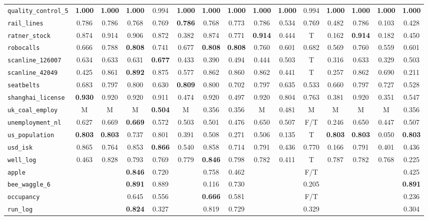 \begin{tabular}{lcccccccccccccc}
\verb+quality_control_5+ & \textbf{1.000} & \textbf{1.000} & \textbf{1.000} & 0.994 & \textbf{1.000} & \textbf{1.000} & \textbf{1.000} & \textbf{1.000} & \textbf{1.000} & 0.994 & \textbf{1.000} & \textbf{1.000} & \textbf{1.000} & \textbf{1.000}\\
\verb+rail_lines+ & 0.786 & 0.786 & 0.768 & 0.769 & \textbf{0.786} & 0.768 & 0.773 & 0.786 & 0.534 & 0.769 & 0.482 & 0.786 & 0.103 & 0.428\\
\verb+ratner_stock+ & 0.874 & 0.914 & 0.906 & 0.872 & 0.382 & 0.874 & 0.771 & \textbf{0.914} & 0.444 & T & 0.162 & \textbf{0.914} & 0.182 & 0.450\\
\verb+robocalls+ & 0.666 & 0.788 & \textbf{0.808} & 0.741 & 0.677 & \textbf{0.808} & \textbf{0.808} & 0.760 & 0.601 & 0.682 & 0.569 & 0.760 & 0.559 & 0.601\\
\verb+scanline_126007+ & 0.634 & 0.633 & 0.631 & \textbf{0.677} & 0.433 & 0.390 & 0.494 & 0.444 & 0.503 & T & 0.316 & 0.633 & 0.329 & 0.503\\
\verb+scanline_42049+ & 0.425 & 0.861 & \textbf{0.892} & 0.875 & 0.577 & 0.862 & 0.860 & 0.862 & 0.441 & T & 0.257 & 0.862 & 0.690 & 0.211\\
\verb+seatbelts+ & 0.683 & 0.797 & 0.800 & 0.630 & \textbf{0.809} & 0.800 & 0.702 & 0.797 & 0.635 & 0.533 & 0.660 & 0.797 & 0.727 & 0.528\\
\verb+shanghai_license+ & \textbf{0.930} & 0.920 & 0.920 & 0.911 & 0.474 & 0.920 & 0.497 & 0.920 & 0.804 & 0.763 & 0.381 & 0.920 & 0.351 & 0.547\\
\verb+uk_coal_employ+ & M & M & M & \textbf{0.504} & M & 0.356 & 0.356 & M & 0.481 & M & M & M & M & 0.356\\
\verb+unemployment_nl+ & 0.627 & 0.669 & \textbf{0.669} & 0.572 & 0.503 & 0.501 & 0.476 & 0.650 & 0.507 & F/T & 0.246 & 0.650 & 0.447 & 0.507\\
\verb+us_population+ & \textbf{0.803} & \textbf{0.803} & 0.737 & 0.801 & 0.391 & 0.508 & 0.271 & 0.506 & 0.135 & T & \textbf{0.803} & \textbf{0.803} & 0.050 & \textbf{0.803}\\
\verb+usd_isk+ & 0.865 & 0.764 & 0.853 & \textbf{0.866} & 0.540 & 0.858 & 0.714 & 0.791 & 0.436 & 0.770 & 0.166 & 0.791 & 0.401 & 0.436\\
\verb+well_log+ & 0.463 & 0.828 & 0.793 & 0.769 & 0.779 & \textbf{0.846} & 0.798 & 0.782 & 0.411 & T & 0.787 & 0.782 & 0.768 & 0.225\\
\hline
\verb+apple+ &  &  & \textbf{0.846} & 0.720 &  & 0.758 & 0.462 &  &  & F/T &  &  &  & 0.425\\
\verb+bee_waggle_6+ &  &  & \textbf{0.891} & 0.889 &  & 0.116 & 0.730 &  &  & 0.205 &  &  &  & \textbf{0.891}\\
\verb+occupancy+ &  &  & 0.645 & 0.556 &  & \textbf{0.666} & 0.581 &  &  & F/T &  &  &  & 0.236\\
\verb+run_log+ &  &  & \textbf{0.824} & 0.327 &  & 0.819 & 0.729 &  &  & 0.329 &  &  &  & 0.304\\
\hline
\end{tabular}
